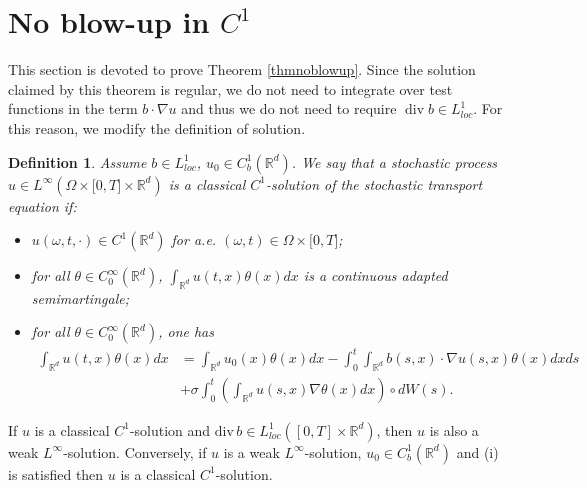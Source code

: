 \documentclass{article}
\newtheorem{definition}[theorem]{Definition}
\begin{document}
\section{No blow-up in $C^{1}\label{section no blow-up}$}





This section is devoted to prove Theorem \ref{thmnoblowup}.
Since the solution
claimed by this theorem is regular, we do not need to integrate over test
functions in the term $b\cdot\nabla u$ and thus we do not need to require
$\operatorname{div}b\in L_{loc}^{1}$. For this reason, we modify the
definition of solution.
\begin{definition}
\label{c11} Assume $b\in L_{loc}^{1}$, $u_{0}\in C^{1}_{b}\left(
\mathbb{R}^{d}\right)  $. We say that a stochastic process $u  \in L^{\infty
}(\Omega\times\lbrack0,T]\times\mathbb{R}^{d})$ is a classical $C^{1}%
$-solution of the stochastic transport equation if:
\begin{itemize}
\item[i)] $u(\omega,t,\cdot)\in C^{1}(\mathbb{R}^{d})$ for a.e. $(\omega,t)\in
\Omega\times\lbrack0,T]$;
\item[ii)] for all $\theta\in C_{0}^{\infty}\left(  \mathbb{R}^{d}\right)  $, $\int_{{\mathbb R}^d}u\left(  t,x\right)  \theta\left(  x\right)  dx$ is a continuous adapted semimartingale;
\item[iii)] for all $\theta\in C_{0}^{\infty}\left(  \mathbb{R}^{d}\right)  $, one
has%
\begin{align*}
\int_{{\mathbb R}^d}u\left(  t,x\right)  \theta\left(  x\right)  dx
&  =\int_{{\mathbb R}^d}u_{0}\left( x\right)  \theta\left(  x\right)
dx-\int_{0}^{t}\int_{{\mathbb R}^d}b\left(  s,x\right)
\cdot\nabla u\left(  s,x\right)  \theta\left(  x\right)  dxds\\
&  +\sigma\int_{0}^{t}\left(  \int_{{\mathbb R}^d}u\left(
s,x\right)  \nabla\theta\left( x\right)  dx\right)  \circ dW\left(
s\right)  .
\end{align*}
\end{itemize}
\end{definition}
If $u$ is a classical $C^{1}$-solution and $\mathrm{div}\,b\in L_{loc}^{1}
\left(  \left[  0,T\right]  \times\mathbb{R}^{d}\right)  $, then $u$ is also a
weak $L^{\infty}$-solution.  Conversely, if $u$ is a weak $L^{\infty}%
$-solution, $u_{0}\in C^{1}_{b}\left(  \mathbb{R}^{d}\right)  $ and (i) is
satisfied then $u$ is a classical $C^{1}$-solution.
\end{document}
